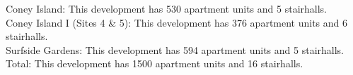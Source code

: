 {Coney Island}: This development has 530 apartment units and 5 stairhalls.\\{Coney Island I (Sites 4 & 5)}: This development has 376 apartment units and 6 stairhalls.\\{Surfside Gardens}: This development has 594 apartment units and 5 stairhalls.\\{Total}: This development has 1500 apartment units and 16 stairhalls.\\